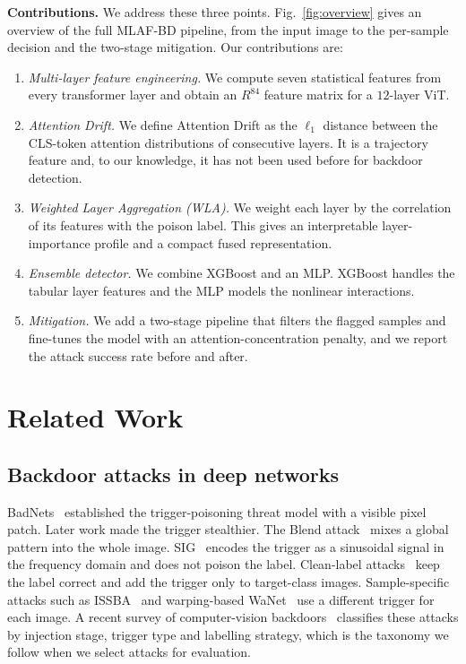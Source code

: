 \documentclass[journal]{IEEEtran}
\begin{document}
\textbf{Contributions.} We address these three points. Fig.~\ref{fig:overview}
gives an overview of the full MLAF-BD pipeline, from the input image to the
per-sample decision and the two-stage mitigation. Our contributions are:
\begin{enumerate}
\item \emph{Multi-layer feature engineering.} We compute seven statistical
features from every transformer layer and obtain an $R^{84}$ feature matrix for
a $12$-layer ViT.
\item \emph{Attention Drift.} We define Attention Drift as the $\ell_1$ distance
between the CLS-token attention distributions of consecutive layers. It is a
trajectory feature and, to our knowledge, it has not been used before for
backdoor detection.
\item \emph{Weighted Layer Aggregation (WLA).} We weight each layer by the
correlation of its features with the poison label. This gives an interpretable
layer-importance profile and a compact fused representation.
\item \emph{Ensemble detector.} We combine XGBoost and an MLP. XGBoost handles
the tabular layer features and the MLP models the nonlinear interactions.
\item \emph{Mitigation.} We add a two-stage pipeline that filters the flagged
samples and fine-tunes the model with an attention-concentration penalty, and
we report the attack success rate before and after.
\end{enumerate}

\section{Related Work}
\subsection{Backdoor attacks in deep networks}
BadNets~\cite{gu2017badnets} established the trigger-poisoning threat model with
a visible pixel patch. Later work made the trigger stealthier. The Blend
attack~\cite{chen2017blend} mixes a global pattern into the whole image.
SIG~\cite{barni2019sig} encodes the trigger as a sinusoidal signal in the
frequency domain and does not poison the label. Clean-label
attacks~\cite{barni2019sig} keep the label correct and add the trigger only to
target-class images. Sample-specific attacks such as ISSBA~\cite{li2021issba}
and warping-based WaNet~\cite{nguyen2021wanet} use a different trigger for each
image. A recent survey of computer-vision backdoors~\cite{wu2023cvsurvey}
classifies these attacks by injection stage, trigger type and labelling
strategy, which is the taxonomy we follow when we select attacks for
evaluation.
\end{document}
